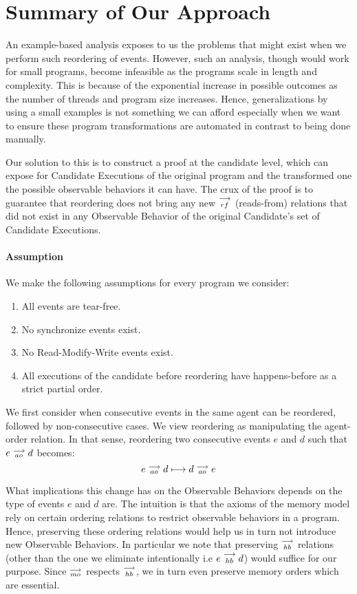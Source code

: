 \section{Summary of Our Approach}

    An example-based analysis exposes to us the problems that might exist when we perform such reordering of events. 
    However, such an analysis, though would work for small programs, become infeasible as the programs scale in length and complexity. 
    This is because of the exponential increase in possible outcomes as the number of threads and program size increases. 
    Hence, generalizations by using a small examples is not something we can afford especially when we want to ensure these program transformations are automated in contrast to being done manually.
    
    Our solution to this is to construct a proof at the candidate level, which can expose for Candidate Executions of the original program and the transformed one the possible observable behaviors it can have.   
    The crux of the proof is to guarantee that reordering does not bring any new $\stackrel{\longrightarrow}{_{rf}}$ (reads-from) relations that did not exist in any Observable Behavior of the original Candidate's set of Candidate Executions. 
    
    \paragraph{Assumption}
    We make the following assumptions for every program we consider:
    \begin{enumerate}
        \item All events are tear-free.
        \item No synchronize events exist.
        \item No Read-Modify-Write events exist.
        \item All executions of the candidate before reordering have happens-before as a strict partial order.
    \end{enumerate}
    
    We first consider when consecutive events in the same agent can be reordered, followed by non-consecutive cases. 
    We view reordering as manipulating the agent-order relation. 
    In that sense, reordering two consecutive events $e$ and $d$ such that $e \stackrel{\longrightarrow}{_{ao}} d$ becomes:
    \[
        e \stackrel{\longrightarrow}{_{ao}} d 
        \longmapsto
        d \stackrel{\longrightarrow}{_{ao}} e 
    \]

    What implications this change has on the Observable Behaviors depends on the type of events $e$ and $d$ are.
    The intuition is that the axioms of the memory model rely on certain ordering relations to restrict observable behaviors in a program.
    Hence, preserving these ordering relations would help us in turn not introduce new Observable Behaviors.
    In particular we note that preserving $\stackrel{\longrightarrow}{_{hb}}$ relations (other than the one we eliminate intentionally i.e $e\stackrel{\longrightarrow}{_{hb}}d$) would suffice for our purpose. 
    Since $\stackrel{\longrightarrow}{_{mo}}$ respects $\stackrel{\longrightarrow}{_{hb}}$, we in turn even preserve memory orders which are essential.  
    

